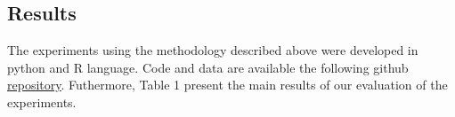 \documentclass{article}
\begin{document}
\subsection{Results}

The experiments using the methodology described above were developed in python and R language. Code and data are available the following github \href{https://github.com/rprimi/enem_challenge}{\underline{repository}}. Futhermore, Table 1 present the main results of our evaluation of the experiments.



\end{document}
